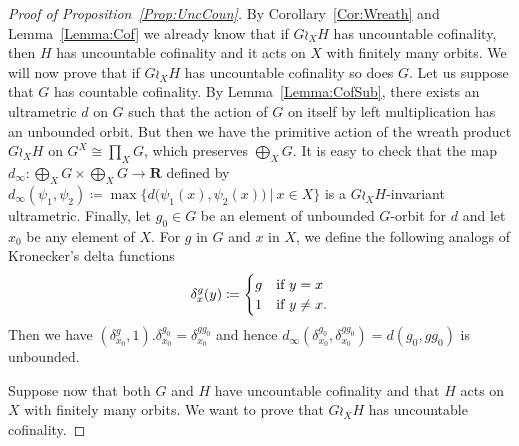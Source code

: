 \documentclass[a4paper]{article}
\theoremstyle{definition}
\newcommand*{\field}[1]{\mathbf{#1}}
\newcommand*{\R}{\field{R}}
\newcommand{\setst}[2]{\{#1\ |\ #2\}}
\begin{document}
%
%
\begin{proof}[Proof of Proposition~\ref{Prop:UncCoun}]
By Corollary~\ref{Cor:Wreath} and Lemma~\ref{Lemma:Cof} we already know that if $G \wr_X H$ has uncountable cofinality, then $H$ has uncountable cofinality and it acts on $X$ with finitely many orbits.
We will now prove that if $G \wr_X H$ has uncountable cofinality so does $G$.
Let us suppose that $G$ has countable cofinality. By Lemma~\ref{Lemma:CofSub}, there exists an ultrametric $d$ on $G$ such that the action of $G$ on itself by left multiplication has an unbounded orbit.
But then we have the primitive action of the wreath product $G\wr_XH$ on $G^X\cong\prod_XG$, which preserves $\bigoplus_XG$.
It is easy to check that the map $d_\infty\colon\bigoplus_XG\times\bigoplus_XG\to\R$ defined by $d_\infty(\psi_1,\psi_2)\coloneqq\max\setst{d\bigl(\psi_1(x),\psi_2(x)\bigr)}{x\in X}$ is a $G\wr_XH$-invariant ultrametric.
Finally, let $g_0\in G$ be an element of unbounded $G$-orbit for $d$ and let $x_0$ be any element of $X$.
For $g$ in $G$ and $x$ in $X$, we define the following analogs of Kronecker's delta functions
\begin{equation*}
\delta_x^g (y) \coloneqq
\begin{cases}
g & \textnormal{if }y = x \\
1 & \textnormal{if } y \neq x.
\end{cases}
\end{equation*}
Then we have $(\delta_{x_0}^g,1).\delta_{x_0}^{g_0}=\delta_{x_0}^{gg_0}$ and hence $d_\infty(\delta_{x_0}^{g_0},\delta_{x_0}^{gg_0})=d(g_0,gg_0)$ is unbounded.

Suppose now that both $G$ and $H$ have uncountable cofinality and that $H$ acts on $X$ with finitely many orbits. We want to prove that $G\wr_XH$ has uncountable cofinality.


\end{proof}
\end{document}
